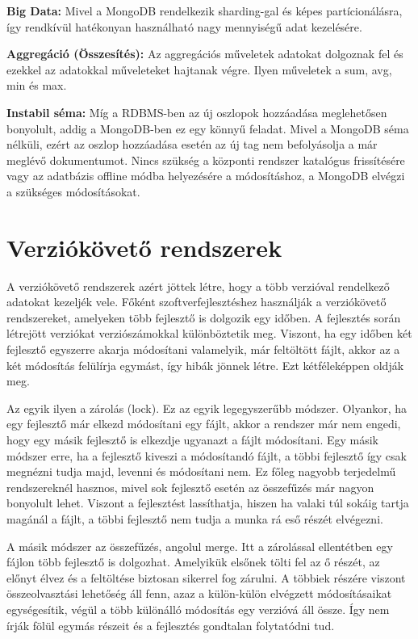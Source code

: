 \textbf{Big Data:} Mivel a MongoDB rendelkezik sharding-gal és képes partícionálásra, így rendkívül hatékonyan használható nagy mennyiségű adat kezelésére.

\textbf{Aggregáció (Összesítés):} Az aggregációs műveletek adatokat dolgoznak fel és ezekkel az adatokkal műveleteket hajtanak végre. Ilyen műveletek a sum, avg, min és max. 

\textbf{Instabil séma:} Míg a RDBMS-ben az új oszlopok hozzáadása meglehetősen bonyolult, addig a MongoDB-ben ez egy könnyű feladat. Mivel a MongoDB séma nélküli, ezért az oszlop hozzáadása esetén az új tag nem befolyásolja a már meglévő dokumentumot. Nincs szükség a központi rendszer katalógus frissítésére vagy az adatbázis offline módba helyezésére a módosításhoz, a MongoDB elvégzi a szükséges módosításokat.

\section{Verziókövető rendszerek}
A verziókövető rendszerek \cite{15} azért jöttek létre, hogy a több verzióval rendelkező adatokat kezeljék vele. Főként szoftverfejlesztéshez használják a verziókövető rendszereket, amelyeken több fejlesztő is dolgozik egy időben. A fejlesztés során létrejött verziókat verziószámokkal különböztetik meg. Viszont, ha egy időben két fejlesztő egyszerre akarja módosítani valamelyik, már feltöltött fájlt, akkor az a két módosítás felülírja egymást, így hibák jönnek létre. Ezt kétféleképpen oldják meg.

Az egyik ilyen a zárolás (lock). Ez az egyik legegyszerűbb módszer. Olyankor, ha egy fejlesztő már elkezd módosítani egy fájlt, akkor a rendszer már nem engedi, hogy egy másik fejlesztő is elkezdje ugyanazt a fájlt módosítani. Egy másik módszer erre, ha a fejlesztő kiveszi a módosítandó fájlt, a többi fejlesztő így csak megnézni tudja majd, levenni és módosítani nem. Ez főleg nagyobb terjedelmű rendszereknél hasznos, mivel sok fejlesztő esetén az összefűzés már nagyon bonyolult lehet. Viszont a fejlesztést lassíthatja, hiszen ha valaki túl sokáig tartja magánál a fájlt, a többi fejlesztő nem tudja a munka rá eső részét elvégezni.

A másik módszer az összefűzés, angolul merge. Itt a zárolással ellentétben egy fájlon több fejlesztő is dolgozhat. Amelyikük elsőnek tölti fel az ő részét, az előnyt élvez és a feltöltése biztosan sikerrel fog zárulni. A többiek részére viszont összeolvasztási lehetőség áll fenn, azaz a külön-külön elvégzett módosításaikat egységesítik, végül a több különálló módosítás egy verzióvá áll össze. Így nem írják fölül egymás részeit és a fejlesztés gondtalan folytatódni tud.


